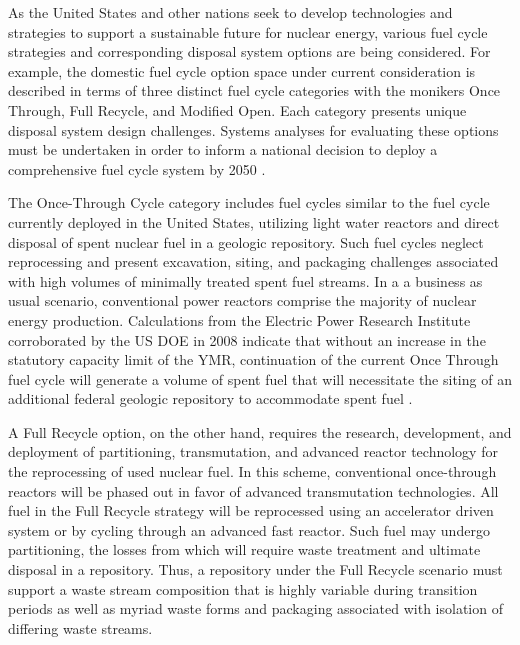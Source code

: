 

As the United States and other nations seek to develop technologies and 
strategies to support a sustainable future for nuclear energy, various fuel 
cycle strategies and corresponding disposal system options are being considered. 
For example, the domestic fuel cycle option space under current consideration is 
described in terms of three distinct fuel cycle categories with the monikers 
Once Through, Full Recycle, and Modified Open. Each category presents unique 
disposal system design challenges. Systems analyses for evaluating these options 
must be undertaken in order to inform a national decision to deploy a 
comprehensive fuel cycle system by 2050 \cite{doe_nuclear_2010}. 


The Once-Through Cycle category includes fuel cycles similar to the fuel cycle 
currently deployed in the United States, utilizing light water reactors and 
direct disposal of spent nuclear fuel in a geologic repository.  Such fuel 
cycles neglect reprocessing and present excavation, siting, and packaging challenges 
associated with high volumes of minimally treated spent fuel streams.  In a 
a business as usual scenario, conventional power reactors 
comprise the majority of nuclear energy production.  Calculations from the 
Electric Power Research Institute corroborated by the \gls{US} \gls{DOE} in 2008 
indicate that without an increase in the statutory capacity limit of the 
\gls{YMR}, continuation of the current Once Through fuel cycle will generate a 
volume of spent fuel that will necessitate the siting of an additional federal 
geologic repository to accommodate spent fuel \cite{kessler_room_2006, 
doe_report_2008}. 


A Full Recycle option, on the other hand, requires the research, development, 
and deployment of partitioning, transmutation, and advanced reactor technology 
for the reprocessing of used nuclear fuel.  In this scheme, conventional 
once-through reactors will be phased out in favor of advanced transmutation 
technologies. All fuel in the Full Recycle strategy will be 
reprocessed using an accelerator driven system or by 
cycling through an advanced fast reactor. Such fuel may undergo partitioning, 
the losses from which will require waste treatment and ultimate disposal in a 
repository. Thus, a repository under the Full Recycle scenario must support
a waste stream composition that is highly variable during transition periods as 
well as myriad waste forms and packaging associated with isolation of differing 
waste streams.

